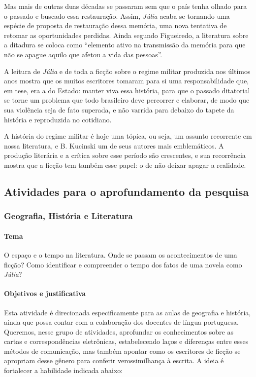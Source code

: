 \documentclass[12pt]{extarticle}
\begin{document}
Mas mais de outras duas décadas se passaram sem que o país tenha olhado
para o passado e buscado essa restauração. Assim, \emph{Júlia} acaba se
tornando uma espécie de proposta de restauração dessa memória, uma nova
tentativa de retomar as oportunidades perdidas. Ainda segundo
Figueiredo, a literatura sobre a ditadura se coloca como ``elemento
ativo na transmissão da memória para que não se apague aquilo que afetou
a vida das pessoas''.

A leitura de \emph{Júlia} e de toda a ficção sobre o regime militar
produzida nos últimos anos mostra que os muitos escritores tomaram para
si uma responsabilidade que, em tese, era a do Estado: manter viva essa
história, para que o passado ditatorial se torne um problema que todo
brasileiro deve percorrer e elaborar, de modo que sua violência seja de
fato superada, e não varrida para debaixo do tapete da história e
reproduzida no cotidiano.

A história do regime militar é hoje uma tópica, ou seja, um assunto
recorrente em nossa literatura, e B. Kucinski um de seus autores mais
emblemáticos. A produção literária e a crítica sobre esse período são
crescentes, e sua recorrência mostra que a ficção tem também esse papel:
o de não deixar apagar a realidade.


\subsection{Atividades para o aprofundamento da pesquisa}

\subsubsection{Geografia, História e Literatura}

\paragraph{Tema} O espaço e o tempo na literatura. Onde se passam os
acontecimentos de uma ficção? Como identificar e compreender o tempo dos
fatos de uma novela como \emph{Júlia}?


\paragraph{Objetivos e justificativa}

Esta atividade é direcionada especificamente para as aulas de geografia
e história, ainda que possa contar com a colaboração dos docentes de
língua portuguesa. Queremos, nesse grupo de atividades, aprofundar os
conhecimentos sobre as cartas e correspondências eletrônicas,
estabelecendo laços e diferenças entre esses métodos de comunicação, mas
também apontar como os escritores de ficção se apropriam desse gênero
para conferir verossimilhança à escrita. A ideia é fortalecer a habilidade indicada abaixo:
\end{document}
